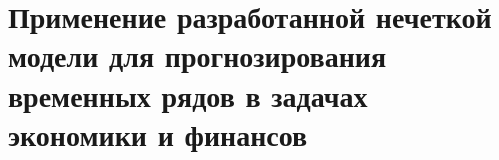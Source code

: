 \chapter{Применение разработанной нечеткой модели для прогнозирования временных рядов в задачах экономики и финансов}

\section{}